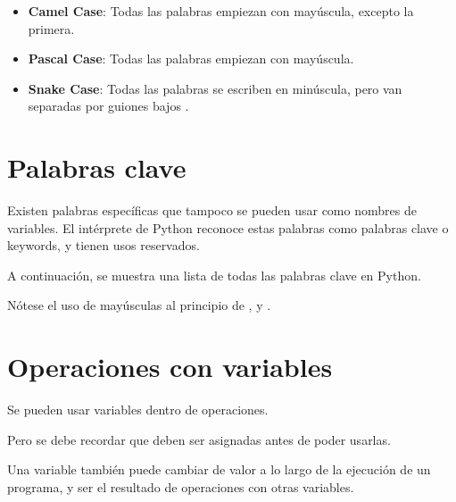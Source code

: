 \begin{itemize}
  \item \textbf{Camel Case}: Todas las palabras empiezan con mayúscula, excepto la primera.
  

  \item \textbf{Pascal Case}: Todas las palabras empiezan con mayúscula.
  

  \item \textbf{Snake Case}: Todas las palabras se escriben en minúscula, pero van separadas por guiones bajos \ttt{\_}.
  

\end{itemize}

\section{Palabras clave}

Existen palabras específicas que tampoco se pueden usar como nombres de variables.
El intérprete de Python reconoce estas palabras como palabras clave o keywords, y tienen usos reservados.

A continuación, se muestra una lista de todas las palabras clave en Python.


Nótese el uso de mayúsculas al principio de ,  y .

\section{Operaciones con variables}

Se pueden usar variables dentro de operaciones.


Pero se debe recordar que deben ser asignadas antes de poder usarlas.


Una variable también puede cambiar de valor a lo largo de la ejecución de un programa, y ser el resultado de operaciones con otras variables.

